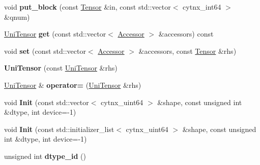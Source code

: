 \begin{DoxyCompactItemize}
\mbox{\label{classcytnx_1_1UniTensor_a9bf19662043d456a89a8e51215c67beb}} 
void {\bfseries put\+\_\+block} (const \hyperlink{classcytnx_1_1Tensor}{Tensor} \&in, const std\+::vector$<$ cytnx\+\_\+int64 $>$ \&qnum)
\item 
\mbox{\label{classcytnx_1_1UniTensor_a2e2d7f3137bb1cfb26e6a19acbc9563e}} 
\hyperlink{classcytnx_1_1UniTensor}{Uni\+Tensor} {\bfseries get} (const std\+::vector$<$ \hyperlink{classcytnx_1_1Accessor}{Accessor} $>$ \&accessors) const
\item 
\mbox{\label{classcytnx_1_1UniTensor_a90ba42a96ac324dfea7436d383fecc79}} 
void {\bfseries set} (const std\+::vector$<$ \hyperlink{classcytnx_1_1Accessor}{Accessor} $>$ \&accessors, const \hyperlink{classcytnx_1_1Tensor}{Tensor} \&rhs)
\item 
\mbox{\label{classcytnx_1_1UniTensor_a456aaaa3a3872c0bae08a51336703a51}} 
{\bfseries Uni\+Tensor} (const \hyperlink{classcytnx_1_1UniTensor}{Uni\+Tensor} \&rhs)
\item 
\mbox{\label{classcytnx_1_1UniTensor_a974f13800e8955636a16cfce89f190ee}} 
\hyperlink{classcytnx_1_1UniTensor}{Uni\+Tensor} \& {\bfseries operator=} (\hyperlink{classcytnx_1_1UniTensor}{Uni\+Tensor} \&rhs)
\item 
\mbox{\label{classcytnx_1_1UniTensor_a8fe1b725002f63bf1073d8fc12203ad7}} 
void {\bfseries Init} (const std\+::vector$<$ cytnx\+\_\+uint64 $>$ \&shape, const unsigned int \&dtype, int device=-\/1)
\item 
\mbox{\label{classcytnx_1_1UniTensor_af6eb02650c3b99572dc36bd41c3ebf58}} 
void {\bfseries Init} (const std\+::initializer\+\_\+list$<$ cytnx\+\_\+uint64 $>$ \&shape, const unsigned int \&dtype, int device=-\/1)
\item 
\mbox{\label{classcytnx_1_1UniTensor_aa99c2d2b912d19c87a91fa163aa9a53d}} 
unsigned int {\bfseries dtype\+\_\+id} ()
\item 
\mbox{\label{classcytnx_1_1UniTensor_abb6901db33114b715dde96301a2780c3}} 

\end{DoxyCompactItemize}
